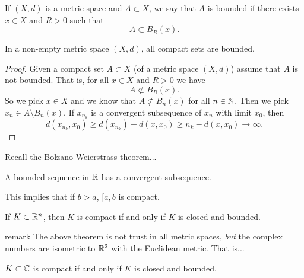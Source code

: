 
\begin{definition}
    If $(X, d)$ is a metric space and $A \subset X$, we say that $A$ is bounded if there exists $x \in X$ and $R > 0$ such that
    \[ A \subset B_R(x). \]
\end{definition}

\begin{lemma}[]
    In a non-empty metric space $(X, d)$, all compact sets are bounded. 
\end{lemma}

\begin{proof}
    Given a compact set $A \subset X$ (of a metric space $(X, d)$) assume that $A$ is not bounded. 
    That is, for all $x \in X$ and $R > 0$ we have
    \[ A \not \subset B_R(x). \]
    So we pick $x \in X$ and we know that $A \not \subset B_n(x)$ for all $n \in \mathbb{N}$. 
    Then we pick $x_n \in A \setminus B_n(x)$. If $x_{n_k}$ is a convergent subsequence of $x_n$ with limit $x_0$, then 
    \[ d(x_{n_k}, x_0) \geq d(x_{n_k}) - d(x, x_0) \geq n_k - d(x, x_0) \to \infty. \]
\end{proof}

\begin{remark}
    Recall the Bolzano-Weierstrass theorem...

    A bounded sequence in $\mathbb{R}$ has a convergent subsequence. 

    This implies that if $b > a$, $[a, b$ is compact.
\end{remark}

\begin{theorem}
    If $K \subset \mathbb{R}^n$, then $K$ is compact if and only if $K$ is closed and bounded.
\end{theorem}

remark  The above theorem is not trust in all metric spaces, \emph{but} the complex numbers are isometric to $\mathbb{R}^2$ with the Euclidean metric. That is...

\begin{theorem}
    $K \subset \mathbb{C}$ is compact if and only if $K$ is closed and bounded.
\end{theorem}

